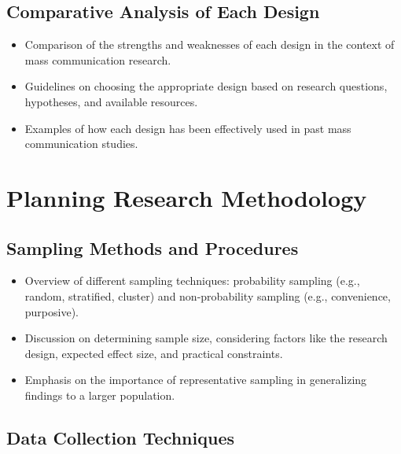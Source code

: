 \documentclass[
]{book}
\begin{document}
\hypertarget{comparative-analysis-of-each-design}{%
\subsection*{Comparative Analysis of Each Design}\label{comparative-analysis-of-each-design}}

\begin{itemize}
\item
  Comparison of the strengths and weaknesses of each design in the context of mass communication research.
\item
  Guidelines on choosing the appropriate design based on research questions, hypotheses, and available resources.
\item
  Examples of how each design has been effectively used in past mass communication studies.
\end{itemize}

\hypertarget{planning-research-methodology}{%
\section*{Planning Research Methodology}\label{planning-research-methodology}}

\hypertarget{sampling-methods-and-procedures}{%
\subsection*{Sampling Methods and Procedures}\label{sampling-methods-and-procedures}}

\begin{itemize}
\item
  Overview of different sampling techniques: probability sampling (e.g., random, stratified, cluster) and non-probability sampling (e.g., convenience, purposive).
\item
  Discussion on determining sample size, considering factors like the research design, expected effect size, and practical constraints.
\item
  Emphasis on the importance of representative sampling in generalizing findings to a larger population.
\end{itemize}

\hypertarget{data-collection-techniques}{%
\subsection*{Data Collection Techniques}\label{data-collection-techniques}}
\end{document}
